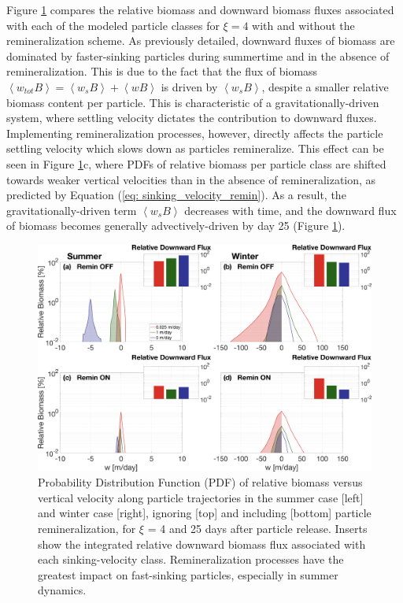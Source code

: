 \documentclass[article,linenumbers]{agujournal2018}
\begin{document}
 Figure \ref{fig: biomass_export_remin} compares the relative biomass and downward biomass fluxes associated with each of the modeled particle classes for $\xi = 4$ with and without the remineralization scheme. As previously detailed, downward fluxes of biomass are dominated by faster-sinking particles during summertime and in the absence of remineralization. This is due to the fact that the flux of biomass $\left<w_{tot}B\right> = \left<w_sB\right> + \left<wB\right>$ is driven by $\left<w_sB\right>$, despite a smaller relative biomass content per particle. This is characteristic of a gravitationally-driven system, where settling velocity dictates the contribution to downward fluxes. Implementing remineralization processes, however, directly affects the particle settling velocity which slows down as particles remineralize. This effect can be seen in Figure \ref{fig: biomass_export_remin}c, where PDFs of relative biomass per particle class are shifted towards weaker vertical velocities than in the absence of remineralization, as predicted by Equation (\ref{eq: sinking_velocity_remin}). As a result, the gravitationally-driven term $\left<w_sB\right>$ decreases with time, and the downward flux of biomass becomes generally advectively-driven by day 25 (Figure \ref{fig: biomass_export_remin}). 
 \begin{figure}[t!]
	\centering
	\includegraphics[width = 1\linewidth]{figures/Fig8.png}
	\caption{Probability Distribution Function (PDF) of relative biomass versus vertical velocity along particle trajectories in the summer case [left] and winter case [right], ignoring [top] and including [bottom] particle remineralization, for $\xi$ = 4 and 25 days after particle release. Inserts show the integrated relative downward biomass flux associated with each sinking-velocity class. Remineralization processes have the greatest impact on fast-sinking particles, especially in summer dynamics.}	
	\label{fig: biomass_export_remin}
\end{figure}
\end{document}

